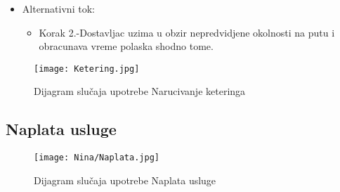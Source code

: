 \documentclass[a4paper]{article}
\begin{document}
      \begin{itemize}
        \item Alternativni tok:
          \begin{itemize}
        \item Korak 2.-Dostavljac uzima u obzir nepredvidjene okolnosti na putu i obracunava vreme polaska shodno tome.
    \end{itemize}
    \end{itemize}
    
\begin{figure}[htp]
    \centering
    \texttt{[image: Ketering.jpg]}
    \caption{Dijagram slučaja upotrebe Narucivanje keteringa}
    \label{fig:Ketering}
\end{figure}


\subsection{Naplata usluge}

\begin{figure}[H]
    \centering
    \texttt{[image: Nina/Naplata.jpg]}
    \caption{Dijagram slučaja upotrebe Naplata usluge}
    \label{fig:RegistracijaZ}
\end{figure}
\end{document}
